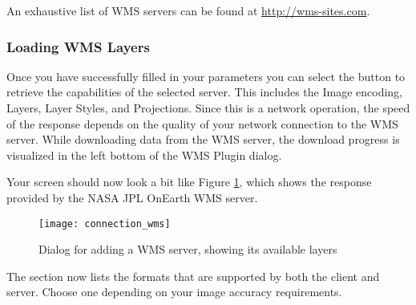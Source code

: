 An exhaustive list of WMS servers can be found at \url{http://wms-sites.com}.

\subsubsection{Loading WMS Layers}\label{sec:ogc-wms-layers}

Once you have successfully filled in your parameters you can select the
button to retrieve the capabilities of the selected server.  This includes the Image encoding,
Layers, Layer Styles, and Projections.  Since this
is a network operation, the speed of the response depends on the quality of your network
connection to the WMS server. While downloading data from the WMS server, the download progress 
is visualized in the left bottom of the WMS Plugin dialog. 

Your screen should now look a bit like Figure \ref{fig:connection_wms}, which shows the 
response provided by the NASA JPL OnEarth WMS server.

\begin{figure}[ht]
  \begin{center}
  	\caption{Dialog for adding a WMS server, showing its available layers \nixcaption}\label{fig:connection_wms}
	\texttt{[image: connection\_wms]}
  \end{center}
\end{figure}


The  section now lists the formats that are supported by both
the client and server.  Choose one depending on your image accuracy requirements.

\begin{Tip}[ht]\caption{\textsc{Image Encoding}}
\end{Tip}

